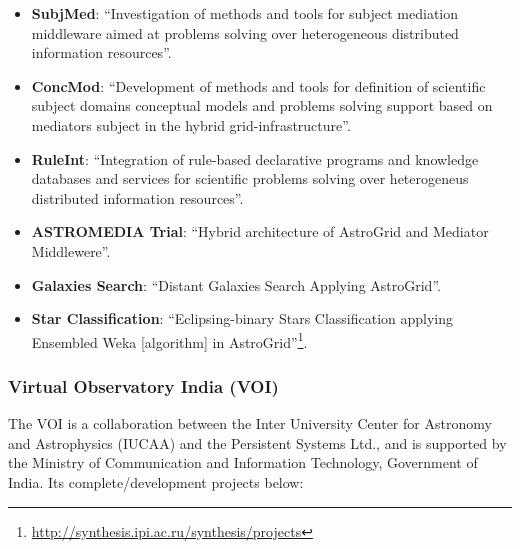 \begin{itemize}
\item \textbf{SubjMed}:
``Investigation of methods and tools for subject mediation middleware aimed at
problems solving over heterogeneous distributed information resources''.

\item \textbf{ConcMod}:
``Development of methods and tools for definition of scientific subject domains
conceptual models and problems solving support based on mediators subject in the
hybrid grid-infrastructure''.

\item \textbf{RuleInt}:
``Integration of rule-based declarative programs and knowledge databases and
services for scientific problems solving over heterogeneus distributed
information resources''.

\item \textbf{ASTROMEDIA Trial}:
``Hybrid architecture of AstroGrid and Mediator Middlewere''.

\item \textbf{Galaxies Search}:
``Distant Galaxies Search Applying AstroGrid''.

\item \textbf{Star Classification}:
``Eclipsing-binary Stars Classification applying Ensembled Weka [algorithm] in
AstroGrid''\footnote{\url{http://synthesis.ipi.ac.ru/synthesis/projects}}.
\end{itemize}

\subsubsection{Virtual Observatory India (VOI)}
The VOI \cite{website:voi-home} is a collaboration between the Inter University
Center for Astronomy and Astrophysics (IUCAA) and the Persistent Systems Ltd.,
and is supported by the Ministry of Communication and Information Technology,
Government of India. Its complete/development projects below:

